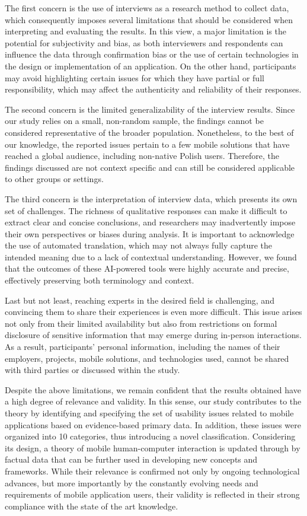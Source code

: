 \documentclass[preprint,12pt,number]{elsarticle}
\begin{document}
The first concern is the use of interviews as a research method to collect data, which consequently imposes several limitations that should be considered when interpreting and evaluating the results. In this view, a major limitation is the potential for subjectivity and bias, as both interviewers and respondents can influence the data through confirmation bias or the use of certain technologies in the design or implementation of an application. On the other hand, participants may avoid highlighting certain issues for which they have partial or full responsibility, which may affect the authenticity and reliability of their responses.

The second concern is the limited generalizability of the interview results. Since our study relies on a small, non-random sample, the findings cannot be considered representative of the broader population. Nonetheless, to the best of our knowledge, the reported issues pertain to a few mobile solutions that have reached a global audience, including non-native Polish users. Therefore, the findings discussed are not context specific and can still be considered applicable to other groups or settings.

The third concern is the interpretation of interview data, which presents its own set of challenges. The richness of qualitative responses can make it difficult to extract clear and concise conclusions, and researchers may inadvertently impose their own perspectives or biases during analysis. It is important to acknowledge the use of automated translation, which may not always fully capture the intended meaning due to a lack of contextual understanding. However, we found that the outcomes of these AI-powered tools were highly accurate and precise, effectively preserving both terminology and context.

Last but not least, reaching experts in the desired field is challenging, and convincing them to share their experiences is even more difficult. This issue arises not only from their limited availability but also from restrictions on formal disclosure of sensitive information that may emerge during in-person interactions. As a result, participants' personal information, including the names of their employers, projects, mobile solutions, and technologies used, cannot be shared with third parties or discussed within the study. 

Despite the above limitations, we remain confident that the results obtained have a high degree of relevance and validity.
In this sense, our study contributes to the theory by identifying and specifying the set of usability issues related to mobile applications based on evidence-based primary data. In addition, these issues were organized into 10 categories, thus introducing a novel classification. Considering its design, a theory of mobile human-computer interaction is updated through by factual data that can be further used in developing new concepts and frameworks. While their relevance is confirmed not only by ongoing technological advances, but more importantly by the constantly evolving needs and requirements of mobile application users, their validity is reflected in their strong compliance with the state of the art knowledge.
\end{document}
